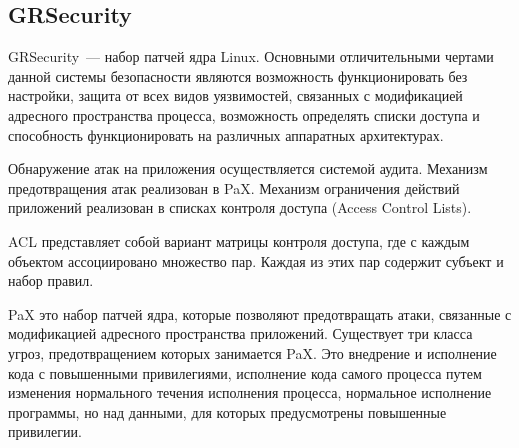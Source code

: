 
\subsection{GRSecurity} 
 
GRSecurity~--- набор патчей ядра Linux.
Основными отличительными чертами данной системы 
безопасности являются возможность функционировать 
без настройки, защита от всех видов уязвимостей, 
связанных с модификацией адресного пространства 
процесса, возможность определять списки доступа и 
способность функционировать на различных аппаратных 
архитектурах. 

Обнаружение атак на приложения осуществляется
системой аудита. Механизм предотвращения атак 
реализован в PaX. Механизм ограничения действий 
приложений реализован в списках контроля доступа
(Access Control Lists). 

ACL представляет собой  вариант матрицы контроля доступа, где с 
каждым объектом ассоциировано множество пар. 
Каждая из этих пар содержит субъект и набор правил. 

PaX это набор патчей ядра, которые позволяют 
предотвращать атаки, связанные с модификацией адресного
пространства приложений. 
Существует три класса угроз, предотвращением которых 
занимается PaX. Это внедрение и исполнение кода с 
повышенными привилегиями, исполнение кода самого 
процесса путем изменения нормального течения 
исполнения процесса, нормальное исполнение программы, 
но над данными, для которых предусмотрены повышенные 
привилегии. 

\begin{comment}
Non-executable pages (NOEXEC) и mmap/mprotect 
(MPROTECT) предотвращают внедрение и исполнение 
кода с повышенными привилегиями. 
Address Layout Randomisation (ASLR) 
позволяет предотвратить все три упомянутые вида атак в той 
ситуации, когда атакующий заранее закладывается на 
адреса в атакуемом процессе и не может узнать о них 
в процессе исполнения. Так как PaX полностью внедрен 
в ядро, предполагается то, что ядро является Trusted 
Computer Base. Инструментарий позволяет предотвратить 
исполнение стека, обеспечить рандомизацию 
размещения адресов внутри адресного пространства 
(address space layout randomization) . 
Основная цель данного проекта — изучение различных защитных 
механизмов, защищающих от эксплойтов уязвимостей ПО, которые 
предоставляют злоумышленнику полные права на чтение/запись в 
системе. Исполнение кода связано с необходимостью изменять 
ход выполнения процесса используя уже существующий код. Одна 
из основных проблем — подмена адресов возврата из функций и 
подмена самих адресов функций. Для установки PaX требуется 
наложить патч на дерево исходных кодов ядра, после чего собрать 
ядро и установить в систему. 
\end{comment}

